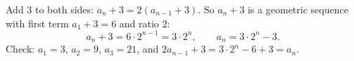 Add $3$ to both sides: $a_n+3=2(a_{n-1}+3)$. So $a_n+3$ is a geometric sequence with first term $a_1+3=6$ and ratio $2$:
\[
a_n+3=6\cdot2^{n-1}=3\cdot2^n,\qquad a_n=\boxed{3\cdot2^n-3}.
\]
Check: $a_1=3$, $a_2=9$, $a_3=21$, and $2a_{n-1}+3=3\cdot2^n-6+3=a_n$.
